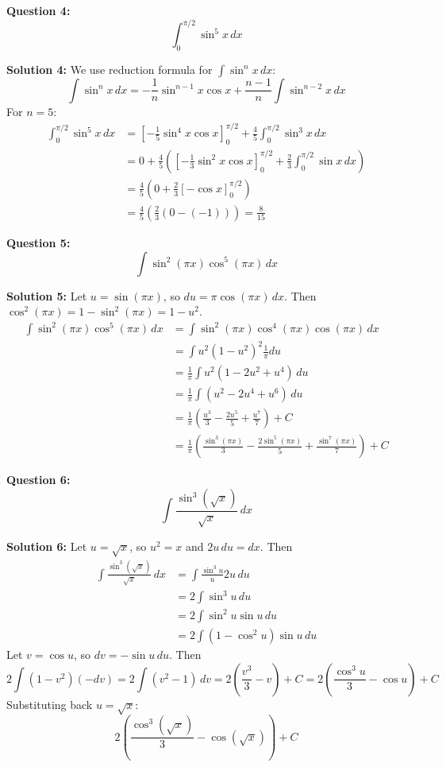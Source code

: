 \documentclass{article}
\begin{document}
\bigskip

\textbf{Question 4:}
\[ \int_0^{\pi/2} \sin^5 x \, dx \]

\textbf{Solution 4:}
We use reduction formula for $\int \sin^n x \, dx$:
\[ \int \sin^n x \, dx = -\frac{1}{n} \sin^{n-1} x \cos x + \frac{n-1}{n} \int \sin^{n-2} x \, dx \]
For $n=5$:
\begin{align*} \int_0^{\pi/2} \sin^5 x \, dx &= \left[ -\frac{1}{5} \sin^4 x \cos x \right]_0^{\pi/2} + \frac{4}{5} \int_0^{\pi/2} \sin^3 x \, dx \\ &= 0 + \frac{4}{5} \left( \left[ -\frac{1}{3} \sin^2 x \cos x \right]_0^{\pi/2} + \frac{2}{3} \int_0^{\pi/2} \sin x \, dx \right) \\ &= \frac{4}{5} \left( 0 + \frac{2}{3} [-\cos x]_0^{\pi/2} \right) \\ &= \frac{4}{5} \left( \frac{2}{3} (0 - (-1)) \right) = \frac{8}{15} \end{align*} 

\bigskip

\textbf{Question 5:}
\[ \int \sin^2 (\pi x) \cos^5 (\pi x) \, dx \]

\textbf{Solution 5:}
Let $u = \sin(\pi x)$, so $du = \pi \cos(\pi x) \, dx$.  Then $\cos^2(\pi x) = 1 - \sin^2(\pi x) = 1 - u^2$.
\begin{align*} \int \sin^2 (\pi x) \cos^5 (\pi x) \, dx &= \int \sin^2 (\pi x) \cos^4 (\pi x) \cos (\pi x) \, dx \\ &= \int u^2 (1 - u^2)^2 \frac{1}{\pi} du \\ &= \frac{1}{\pi} \int u^2 (1 - 2u^2 + u^4) \, du \\ &= \frac{1}{\pi} \int (u^2 - 2u^4 + u^6) \, du \\ &= \frac{1}{\pi} \left( \frac{u^3}{3} - \frac{2u^5}{5} + \frac{u^7}{7} \right) + C \\ &= \frac{1}{\pi} \left( \frac{\sin^3(\pi x)}{3} - \frac{2\sin^5(\pi x)}{5} + \frac{\sin^7(\pi x)}{7} \right) + C \end{align*} 

\bigskip

\textbf{Question 6:}
\[ \int \frac{\sin^3 (\sqrt{x})}{\sqrt{x}} \, dx \]

\textbf{Solution 6:}
Let $u = \sqrt{x}$, so $u^2 = x$ and $2u \, du = dx$. Then
\begin{align*} \int \frac{\sin^3 (\sqrt{x})}{\sqrt{x}} \, dx &= \int \frac{\sin^3 u}{u} 2u \, du \\ &= 2 \int \sin^3 u \, du \\ &= 2 \int \sin^2 u \sin u \, du \\ &= 2 \int (1 - \cos^2 u) \sin u \, du \end{align*} 
Let $v = \cos u$, so $dv = -\sin u \, du$. Then
\[ 2 \int (1 - v^2)(-dv) = 2 \int (v^2 - 1) \, dv = 2 \left( \frac{v^3}{3} - v \right) + C = 2 \left( \frac{\cos^3 u}{3} - \cos u \right) + C \]
Substituting back $u = \sqrt{x}$:
\[ 2 \left( \frac{\cos^3 (\sqrt{x})}{3} - \cos (\sqrt{x}) \right) + C \]
\end{document}
